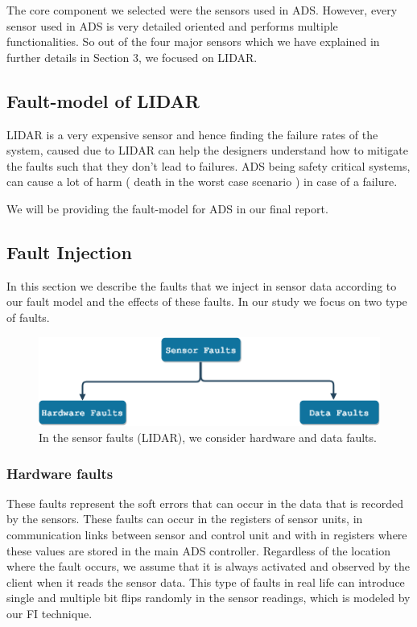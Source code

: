  The core component we selected were the  sensors used in ADS. However, every sensor used in ADS is very detailed oriented and performs multiple functionalities. So out of the four major sensors which we have explained in further details in Section 3, we focused on LIDAR. 
 
 \subsection{Fault-model of LIDAR}
 LIDAR is a very expensive sensor and hence finding the failure rates of the system, caused due to LIDAR can help the designers understand how to mitigate the faults such that they don't lead to failures. ADS being safety critical systems, can cause a lot of harm ( death in the worst case scenario ) in case of a failure. 
 
 We will be providing the fault-model for ADS in our final report.
 
\subsection{Fault Injection} \label{fi_m}
In this section we describe the faults that we inject in sensor data according to our fault model and the effects of these faults. In our study we focus on two type of faults.

\begin{figure}
	\centering
	\includegraphics[width=1.0\linewidth]{Sensor-faults}
	\caption{In the sensor faults (LIDAR), we consider hardware and data faults. }
	\label{fig:sensor-faults}
\end{figure}

\subsubsection{Hardware faults} These faults represent the soft errors that can occur in the data that is recorded by the sensors. These faults can occur in the registers of sensor units, in communication links between sensor and control unit and with in registers where these values are stored in the main ADS controller. Regardless of the location where the fault occurs, we assume that it is always activated and observed by the client when it reads the sensor data. This type of faults in real life can introduce single and multiple bit flips randomly in the sensor readings, which is modeled by our FI technique.
	
